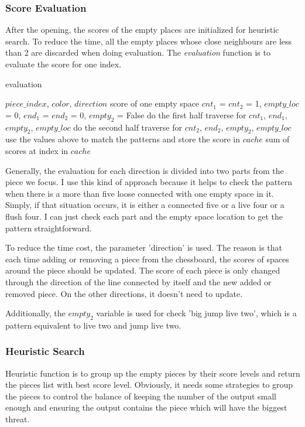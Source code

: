 \documentclass[9pt,shortpaper,twoside,web]{ieeecolor}
\begin{document}
\subsubsection{Score Evaluation}
After the opening, the scores of the empty places are initialized for heuristic search. To reduce the time, all the empty places whose close neighbours are less than 2 are discarded when doing evaluation. The \textit{evaluation} function is to evaluate the score for one index.

\begin{algorithm}
 \caption{evaluation}
 \begin{algorithmic}[h]
 \renewcommand{\algorithmicrequire}{\textbf{Input:}}
 \renewcommand{\algorithmicensure}{\textbf{Output:}}
 \REQUIRE $piece\_index$, $color$, $direction$
 \ENSURE score of one empty space 
  \STATE $cnt_1$ = $cnt_2$ = 1, $empty\_loc$ = 0, $end_1$ = $end_2$ = 0, $empty_2$ = False
  \STATE do the first half traverse for $cnt_1$, $end_1$, $empty_2$, $empty\_loc$
  \STATE do the second half traverse for $cnt_2$, $end_2$, $empty_2$, $empty\_loc$
  \ENDIF
  \STATE use the values above to match the patterns and store the score in $cache$
  \ENDIF
  \ENDFOR
  \RETURN sum of scores at index in $cache$
 \end{algorithmic} 
 \end{algorithm}
 
Generally, the evaluation for each direction is divided into two parts from the piece we focus. I use this kind of approach because it helps to check the pattern when there is a more than five loose connected with one empty space in it. Simply, if that situation occurs, it is either a connected five or a live four or a flush four. I can just check each part and the empty space location to get the pattern straightforward.

To reduce the time cost, the parameter 'direction' is used. The reason is that each time adding or removing a piece from the chessboard, the scores of spaces around the piece should be updated. The score of each piece is only changed through the direction of the line connected by itself and the new added or removed piece. On the other directions, it doesn't need to update.

Additionally, the $empty_2$ variable is used for check 'big jump live two', which is a pattern equivalent to live two and jump live two. 

\subsubsection{Heuristic Search}
Heuristic function is to group up the empty pieces by their score levels and return the pieces list with best score level. Obviously, it needs some strategies to group the pieces to control the balance of keeping the number of the output small enough and ensuring the output contains the piece which will have the biggest threat. 
\end{document}
